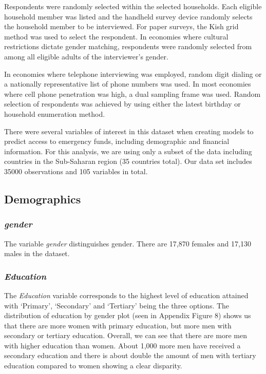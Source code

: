 \documentclass[water,article,submit,moreauthors,pdftex]{mdpi}
\begin{document}
Respondents were randomly selected within the selected households. Each
eligible household member was listed and the handheld survey device
randomly selects the household member to be interviewed. For paper
surveys, the Kish grid method was used to select the respondent. In
economies where cultural restrictions dictate gender matching,
respondents were randomly selected from among all eligible adults of the
interviewer's gender.

In economies where telephone interviewing was employed, random digit
dialing or a nationally representative list of phone numbers was used.
In most economies where cell phone penetration was high, a dual sampling
frame was used. Random selection of respondents was achieved by using
either the latest birthday or household enumeration method.

There were several variables of interest in this dataset when creating
models to predict access to emergency funds, including demographic and
financial information. For this analysis, we are using only a subset of
the data including countries in the Sub-Saharan region (35 countries
total). Our data set includes 35000 observations and 105 variables in
total.

\hypertarget{demographics}{%
\subsection{Demographics}\label{demographics}}

\hypertarget{gender}{%
\subsubsection{\texorpdfstring{\emph{gender}}{gender}}\label{gender}}

The variable \emph{gender} distinguishes gender. There are 17,870
females and 17,130 males in the dataset.

\hypertarget{education}{%
\subsubsection{\texorpdfstring{\emph{Education}}{Education}}\label{education}}

The \emph{Education} variable corresponds to the highest level of
education attained with `Primary', `Secondary' and `Tertiary' being the
three options. The distribution of education by gender plot (seen in
Appendix Figure 8) shows us that there are more women with primary
education, but more men with secondary or tertiary education. Overall,
we can see that there are more men with higher education than women.
About 1,000 more men have received a secondary education and there is
about double the amount of men with tertiary education compared to women
showing a clear disparity.
\end{document}
